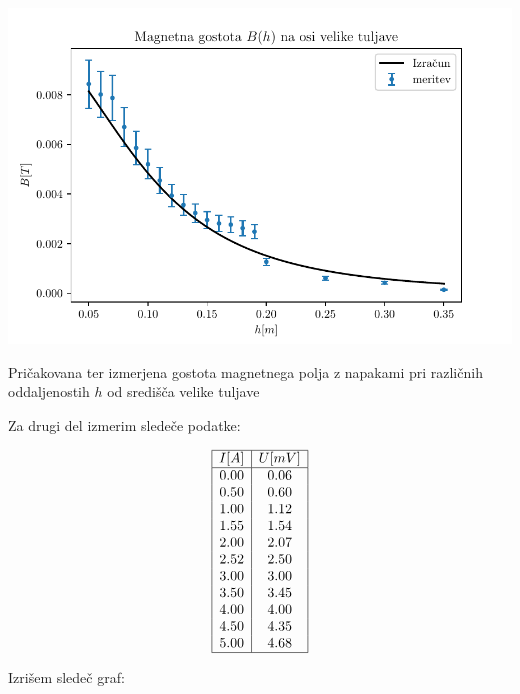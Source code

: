 \documentclass[12pt]{report}
\begin{document}
\begin{slika}[H]
  \centering
  \includegraphics{graf1}
  \caption{\small Pričakovana ter izmerjena gostota magnetnega polja z napakami pri različnih oddaljenostih $h$ od središča velike tuljave}
\end{slika}

Za drugi del izmerim sledeče podatke: 


\begin{tabela}[H]
  \centering
  \[
  \begin{array}{|c|c|} \hline
    I[A] & U[mV] \\ \hline
    0.00 &    0.06\\
    0.50 &    0.60\\
    1.00 &    1.12\\
    1.55 &    1.54\\
    2.00 &    2.07\\
    2.52 &    2.50\\
    3.00 &    3.00\\
    3.50 &    3.45\\
    4.00 &    4.00\\
    4.50 &    4.35\\
    5.00 &    4.68 \\ \hline
  \end{array}  
  \]
\end{tabela}


Izrišem sledeč graf: 
\end{document}
